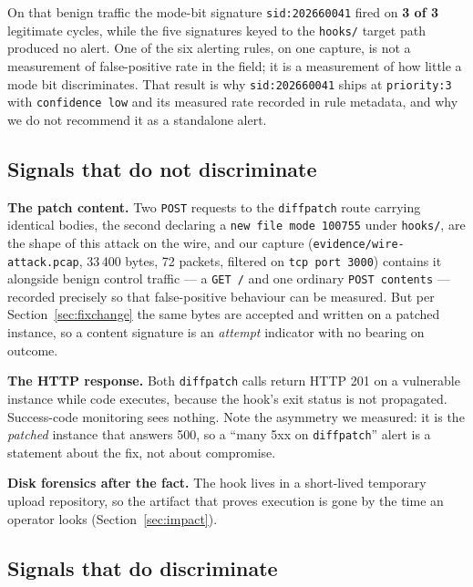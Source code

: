 \documentclass[journal]{IEEEtran}
\begin{document}
On that benign traffic the mode-bit signature \texttt{sid:202660041} fired on
\textbf{3 of 3} legitimate cycles, while the five signatures keyed to the
\texttt{hooks/} target path produced no alert. One of the six alerting
rules, on one capture, is not a measurement of false-positive rate in the field;
it is a measurement of how little a mode bit discriminates. That result is why
\texttt{sid:202660041} ships at \texttt{priority:3} with
\texttt{confidence~low} and its measured rate recorded in rule metadata, and why
we do not recommend it as a standalone alert.

\subsection{Signals that do not discriminate}

\textbf{The patch content.} Two \texttt{POST} requests to the
\texttt{diffpatch} route carrying identical bodies, the second declaring a
\texttt{new file mode 100755} under \texttt{hooks/}, are the shape of this
attack on the wire, and our capture (\texttt{evidence/wire-attack.pcap}, 33\,400
bytes, 72 packets, filtered on \texttt{tcp port 3000}) contains it alongside
benign control traffic --- a \texttt{GET /} and one ordinary \texttt{POST
contents} --- recorded precisely so that false-positive behaviour can be
measured. But per Section~\ref{sec:fixchange} the same bytes are accepted and
written on a patched instance, so a content signature is an \emph{attempt}
indicator with no bearing on outcome.

\textbf{The HTTP response.} Both \texttt{diffpatch} calls return HTTP 201 on a
vulnerable instance while code executes, because the hook's exit status is not
propagated. Success-code monitoring sees nothing. Note the asymmetry we
measured: it is the \emph{patched} instance that answers 500, so a ``many 5xx on
\texttt{diffpatch}'' alert is a statement about the fix, not about compromise.

\textbf{Disk forensics after the fact.} The hook lives in a short-lived
temporary upload repository, so the artifact that proves execution is gone by
the time an operator looks (Section~\ref{sec:impact}).

\subsection{Signals that do discriminate}
\end{document}
